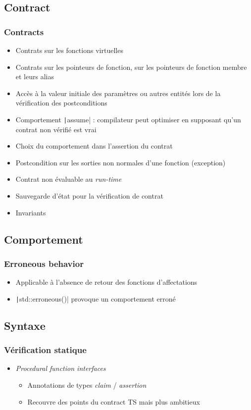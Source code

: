 \documentclass[C++.tex]{subfiles}
\begin{document}
\subsection*{Contract}
\begin{frame}[fragile]
	\frametitle{Contracts}
	\begin{itemize}
		\item Contrats sur les fonctions virtuelles
		\item Contrats sur les pointeurs de fonction, sur les pointeurs de fonction membre et leurs alias
		\item Accès à la valeur initiale des paramètres ou autres entités lors de la vérification des postconditions
		\item Comportement \texttt|assume| : compilateur peut optimiser en supposant qu'un contrat non vérifié est vrai
		\item Choix du comportement dans l'assertion du contrat
		\item Postcondition sur les sorties non normales d'une fonction (exception)
		\item Contrat non évaluable au \textit{run-time}
		\item Sauvegarde d'état pour la vérification de contrat
		\item Invariants
	\end{itemize}
\end{frame}

\subsection*{Comportement}
\begin{frame}[fragile]
	\frametitle{Erroneous behavior}
	\begin{itemize}
		\item Applicable à l'absence de retour des fonctions d'affectations
		\item \texttt|std::erroneous()| provoque un comportement erroné
	\end{itemize}

\end{frame}

\subsection*{Syntaxe}
\begin{frame}[fragile]
	\frametitle{Vérification statique}
	\begin{itemize}
		\item \textit{Procedural function interfaces}
		\begin{itemize}
			\item Annotations de types \textit{claim} / \textit{assertion}
			\item Recouvre des points du contract TS mais plus ambitieux
		\end{itemize}
	\end{itemize}
\end{frame}
\end{document}
